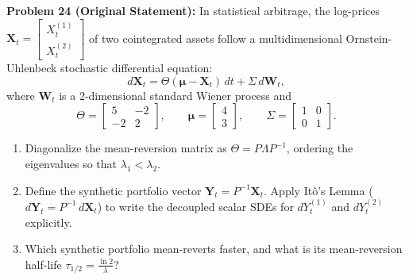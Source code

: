 \documentclass[11pt, letterpaper]{article}
\theoremstyle{definition}
\theoremstyle{remark}
\begin{document}
\vspace{0.8em}
\textbf{Problem 24 (Original Statement):}
In statistical arbitrage, the log-prices $\mathbf{X}_{t} = \begin{bmatrix} X_{t}^{(1)} \\ X_{t}^{(2)} \end{bmatrix}$ of two cointegrated assets follow a multidimensional Ornstein-Uhlenbeck stochastic differential equation:
\[
d\mathbf{X}_{t} = \Theta(\boldsymbol{\mu} - \mathbf{X}_{t})\,dt + \Sigma\,d\mathbf{W}_{t},
\]
where $\mathbf{W}_{t}$ is a $2$-dimensional standard Wiener process and
\[
\Theta = \begin{bmatrix} 5 & -2 \\ -2 & 2 \end{bmatrix}, \qquad \boldsymbol{\mu} = \begin{bmatrix} 4 \\ 3 \end{bmatrix}, \qquad \Sigma = \begin{bmatrix} 1 & 0 \\ 0 & 1 \end{bmatrix}.
\]
\begin{enumerate}[label=(\alph*)]
    \item Diagonalize the mean-reversion matrix as $\Theta = P\Lambda P^{-1}$, ordering the eigenvalues so that $\lambda_{1} < \lambda_{2}$.
    \item Define the synthetic portfolio vector $\mathbf{Y}_{t} = P^{-1}\mathbf{X}_{t}$. Apply It\^{o}'s Lemma ($d\mathbf{Y}_{t} = P^{-1}\,d\mathbf{X}_{t}$) to write the decoupled scalar SDEs for $dY_{t}^{(1)}$ and $dY_{t}^{(2)}$ explicitly.
    \item Which synthetic portfolio mean-reverts faster, and what is its mean-reversion half-life $\tau_{1/2} = \frac{\ln 2}{\lambda}$?
\end{enumerate}
\end{document}
